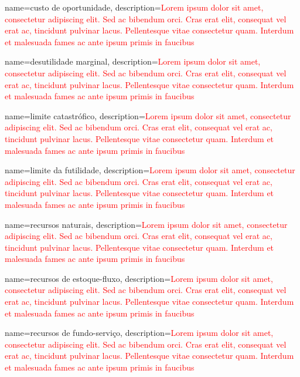 {
	name=custo de oportunidade,
	description={\textcolor{red}{Lorem ipsum dolor sit amet, consectetur adipiscing elit. Sed ac bibendum orci. Cras erat elit, consequat vel erat ac, tincidunt pulvinar lacus. Pellentesque vitae consectetur quam. Interdum et malesuada fames ac ante ipsum primis in faucibus}}
}

{
	name=desutilidade marginal,
	description={\textcolor{red}{Lorem ipsum dolor sit amet, consectetur adipiscing elit. Sed ac bibendum orci. Cras erat elit, consequat vel erat ac, tincidunt pulvinar lacus. Pellentesque vitae consectetur quam. Interdum et malesuada fames ac ante ipsum primis in faucibus}}
}

{
	name=limite catastrófico,
	description={\textcolor{red}{Lorem ipsum dolor sit amet, consectetur adipiscing elit. Sed ac bibendum orci. Cras erat elit, consequat vel erat ac, tincidunt pulvinar lacus. Pellentesque vitae consectetur quam. Interdum et malesuada fames ac ante ipsum primis in faucibus}}
}

{
	name=limite da futilidade,
	description={\textcolor{red}{Lorem ipsum dolor sit amet, consectetur adipiscing elit. Sed ac bibendum orci. Cras erat elit, consequat vel erat ac, tincidunt pulvinar lacus. Pellentesque vitae consectetur quam. Interdum et malesuada fames ac ante ipsum primis in faucibus}}
}

{
	name=recursos naturais,
	description={\textcolor{red}{Lorem ipsum dolor sit amet, consectetur adipiscing elit. Sed ac bibendum orci. Cras erat elit, consequat vel erat ac, tincidunt pulvinar lacus. Pellentesque vitae consectetur quam. Interdum et malesuada fames ac ante ipsum primis in faucibus}}
}

{
	name=recursos de estoque-fluxo,
	description={\textcolor{red}{Lorem ipsum dolor sit amet, consectetur adipiscing elit. Sed ac bibendum orci. Cras erat elit, consequat vel erat ac, tincidunt pulvinar lacus. Pellentesque vitae consectetur quam. Interdum et malesuada fames ac ante ipsum primis in faucibus}}
}

{
	name=recursos de fundo-serviço,
	description={\textcolor{red}{Lorem ipsum dolor sit amet, consectetur adipiscing elit. Sed ac bibendum orci. Cras erat elit, consequat vel erat ac, tincidunt pulvinar lacus. Pellentesque vitae consectetur quam. Interdum et malesuada fames ac ante ipsum primis in faucibus}}
}

